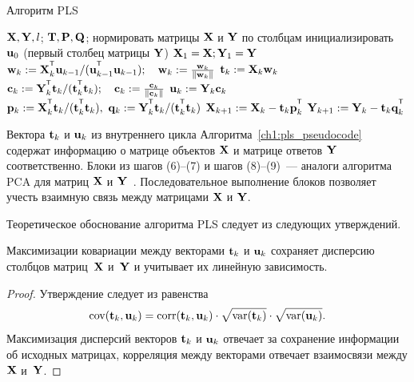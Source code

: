 \begin{algorithm}[h]
	\caption{Алгоритм PLS}
	\label{ch1:pls_pseudocode}
	\begin{algorithmic}[1]
		\REQUIRE $\mathbf{X}, \mathbf{Y}, l$;
		\ENSURE $\mathbf{T}, \mathbf{P}, \mathbf{Q}$;
		\STATE нормировать матрицы $\mathbf{X}$ и $\mathbf{Y}$ по столбцам
		\STATE инициализировать $\mathbf{u}_0$ (первый столбец матрицы $\mathbf{Y}$)
		\STATE $\mathbf{X}_1 = \mathbf{X}; \mathbf{Y}_1 = \mathbf{Y}$
		\REPEAT
		\vspace{0.1cm}
		\STATE $\bw_k := \bX_k^{\T} \bu_{k-1} / (\bu_{k-1}^{\T} \bu_{k-1}); \quad \bw_k: = \frac{\bw_k}{\| \bw_k \|}$
		\vspace{0.1cm}
		\STATE $\mathbf{t}_k := \mathbf{X}_k \mathbf{w}_k$
		\vspace{0.1cm}
		\STATE $\bc_k := \bY_k^{\T} \bt_k / (\bt_k^{\T} \bt_k); \quad \bc_k: = \frac{\bc_k}{\| \bc_k \|}$
		\vspace{0.1cm}
		\STATE $\mathbf{u}_k := \mathbf{Y}_k \mathbf{c}_k$
		\vspace{0.1cm}
		\STATE $\bp_k:= \bX_k^{\T}\bt_k/(\bt_k^{\T}\bt_k),\ 
		\bq_k := \bY_k^{\T}\bt_k/(\bt_k^{\T}\bt_k)$
		\vspace{0.2cm}
		\STATE $\bX_{k+1} :=  \bX_k - \bt_k \bp_k^{\T}$
		\vspace{0.2cm}
		\STATE $\bY_{k + 1} :=  \bY_k - \bt_k \bq_k^{\T}$ 
		\ENDFOR
	\end{algorithmic}
\end{algorithm}

Вектора $\mathbf{t}_k$ и $\mathbf{u}_k$ из внутреннего цикла Алгоритма~\ref{ch1:pls_pseudocode}
содержат информацию о матрице объектов $\mathbf{X}$ и матрице ответов $\mathbf{Y}$ соответственно. 
Блоки из шагов (6)--(7) и шагов (8)--(9)~--- аналоги алгоритма PCA для матриц $\mathbf{X}$ и $\mathbf{Y}$~\cite{geladi1988pls}. 
Последовательное выполнение блоков позволяет учесть взаимную связь между матрицами $\mathbf{X}$ и $\mathbf{Y}$.

Теоретическое обоснование алгоритма PLS следует из следующих утверждений.
\begin{statement}
	Максимизации ковариации между векторами $\mathbf{t}_k$ и $\mathbf{u}_k$ сохраняет дисперсию столбцов матриц~$\mathbf{X}$ и~$\mathbf{Y}$ и учитывает их линейную зависимость.
\end{statement}
\begin{proof}
	Утверждение следует из равенства
	\[
	\text{cov} (\mathbf{t}_k, \mathbf{u}_k) = \text{corr} (\mathbf{t}_k, \mathbf{u}_k) \cdot \sqrt{\text{var}(\mathbf{t}_k)} \cdot \sqrt{\text{var}(\mathbf{u}_k)}.
	\]
	Максимизация дисперсий векторов $\mathbf{t}_k$ и $\mathbf{u}_k$ отвечает за сохранение информации об исходных матрицах, 
	корреляция между векторами отвечает взаимосвязи между $\mathbf{X}$ и~$\mathbf{Y}$. 
\end{proof}

